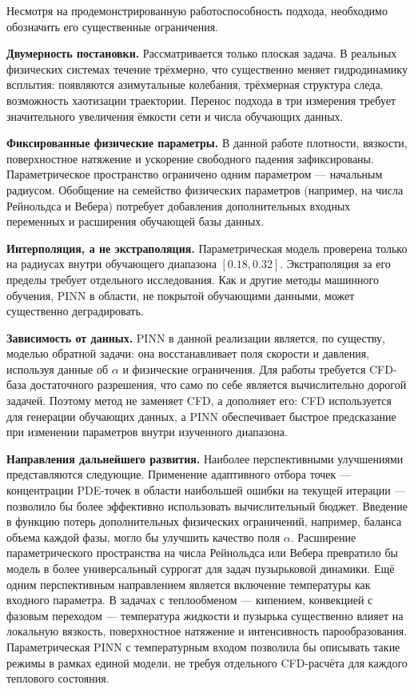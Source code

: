 \documentclass[12pt,a4paper]{article}
\begin{document}
Несмотря на продемонстрированную работоспособность подхода, необходимо
обозначить его существенные ограничения.

\textbf{Двумерность постановки.} Рассматривается только плоская задача. В
реальных физических системах течение трёхмерно, что существенно меняет
гидродинамику всплытия: появляются азимутальные колебания, трёхмерная структура
следа, возможность хаотизации траектории. Перенос подхода в три измерения
требует значительного увеличения ёмкости сети и числа обучающих данных.

\textbf{Фиксированные физические параметры.} В данной работе плотности,
вязкости, поверхностное натяжение и ускорение свободного падения зафиксированы.
Параметрическое пространство ограничено одним параметром --- начальным радиусом.
Обобщение на семейство физических параметров (например, на числа Рейнольдса и
Вебера) потребует добавления дополнительных входных переменных и расширения
обучающей базы данных.

\textbf{Интерполяция, а не экстраполяция.} Параметрическая модель проверена
только на радиусах внутри обучающего диапазона \([0.18, 0.32]\). Экстраполяция
за его пределы требует отдельного исследования. Как и другие методы машинного
обучения, PINN в области, не покрытой обучающими данными, может существенно
деградировать.

\textbf{Зависимость от данных.} PINN в данной реализации является, по существу,
моделью обратной задачи: она восстанавливает поля скорости и давления, используя
данные об \(\alpha\) и физические ограничения. Для работы требуется CFD-база
достаточного разрешения, что само по себе является вычислительно дорогой задачей.
Поэтому метод не заменяет CFD, а дополняет его: CFD используется для генерации
обучающих данных, а PINN обеспечивает быстрое предсказание при изменении
параметров внутри изученного диапазона.

\textbf{Направления дальнейшего развития.} Наиболее перспективными улучшениями
представляются следующие. Применение адаптивного отбора точек --- концентрации
PDE-точек в области наибольшей ошибки на текущей итерации --- позволило бы
более эффективно использовать вычислительный бюджет. Введение в функцию потерь
дополнительных физических ограничений, например, баланса объема каждой фазы,
могло бы улучшить качество поля \(\alpha\). Расширение параметрического пространства на числа Рейнольдса или Вебера
превратило бы модель в более универсальный суррогат для задач пузырьковой
динамики. Ещё одним перспективным направлением является включение температуры
как входного параметра. В задачах с теплообменом --- кипением, конвекцией с
фазовым переходом --- температура жидкости и пузырька существенно влияет на
локальную вязкость, поверхностное натяжение и интенсивность парообразования.
Параметрическая PINN с температурным входом позволила бы описывать такие
режимы в рамках единой модели, не требуя отдельного CFD-расчёта для каждого
теплового состояния.
\end{document}
